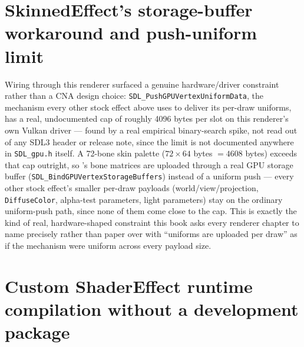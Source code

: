 \section{SkinnedEffect's storage-buffer workaround and push-uniform limit}

Wiring  through this renderer surfaced a genuine hardware/driver
constraint rather than a CNA design choice: \texttt{SDL\_PushGPUVertexUniformData}, the
mechanism every other stock effect above uses to deliver its per-draw uniforms, has a real,
undocumented cap of roughly 4096 bytes per slot on this renderer's own Vulkan driver --- found by
a real empirical binary-search spike, not read out of any SDL3 header or release note, since
the limit is not documented anywhere in \texttt{SDL\_gpu.h} itself. A 72-bone skin palette
(\(72 \times 64\) bytes \(= 4608\) bytes) exceeds that cap outright, so
's bone matrices are uploaded through a real GPU storage buffer
(\texttt{SDL\_BindGPUVertexStorageBuffers}) instead of a uniform push --- every other stock
effect's smaller per-draw payloads (world/view/projection, \texttt{DiffuseColor}, alpha-test
parameters, light parameters) stay on the ordinary uniform-push path, since none of them come
close to the cap. This is exactly the kind of real, hardware-shaped constraint this book asks
every renderer chapter to name precisely rather than paper over with ``uniforms are uploaded
per draw'' as if the mechanism were uniform across every payload size.

\section{Custom ShaderEffect runtime compilation without a development package}

